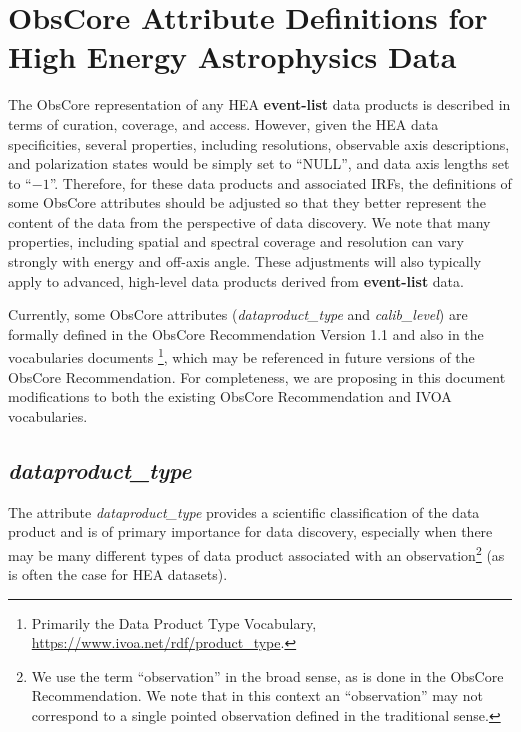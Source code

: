 \documentclass[11pt,a4paper]{ivoa}
\begin{document}
\section{ObsCore Attribute Definitions for High Energy Astrophysics Data}
\label{sec:obscore}

The ObsCore representation of any \gls{HEA} \textbf{event-list} data products is described in terms of curation, coverage, and access. However, given the \gls{HEA} data specificities, several properties, including resolutions, observable axis descriptions, and polarization states would be simply set to ``NULL'', and data axis lengths set to ``$-1$''. Therefore, for these data products and associated \glspl{IRF}, the definitions of some ObsCore attributes should be adjusted so that they better represent the content of the data from the perspective of data discovery. We note that many properties, including spatial and spectral coverage and resolution can vary strongly with energy and off-axis angle. These adjustments will also typically apply to advanced, high-level data products derived from \textbf{event-list} data.

Currently, some ObsCore attributes ({\em dataproduct\_type\/} and {\em calib\_level\/}) are formally defined in the ObsCore Recommendation Version 1.1 \citep{2017ivoa.spec.0509L} and also in the vocabularies documents \citep{2023ivoa.spec.0206D, 2021ivoa.spec.0525D}\footnote{Primarily the Data Product Type Vocabulary, \url{https://www.ivoa.net/rdf/product_type}.}, which may be referenced in future versions of the ObsCore Recommendation.  For completeness, we are proposing in this document modifications to both the existing ObsCore Recommendation and IVOA vocabularies.

\subsection{{\em dataproduct\_type}}
\label{sec:dataproduct_type}

The attribute {\em dataproduct\_type\/} provides a scientific classification of the data product and is of primary importance for data discovery, especially when there may be many different types of data product associated with an observation\footnote{We use the term ``observation'' in the broad sense, as is done in the ObsCore Recommendation. We note that in this context an ``observation'' may not correspond to a single pointed observation defined in the traditional sense.} (as is often the case for \gls{HEA} datasets).
\end{document}
